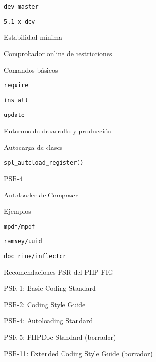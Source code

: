 \begin{longenum}
\begin{longenum}
\begin{longenum}
\begin{longenum}
                \begin{longenum}
                    \item \texttt{dev-master}
                    \item \texttt{5.1.x-dev}
                \end{longenum}
                \item Estabilidad mínima
                \item Comprobador online de restricciones
            \end{longenum}
            \item Comandos básicos
            \begin{longenum}
                \item \texttt{require}
                \item \texttt{install}
                \item \texttt{update}
            \end{longenum}
            \item Entornos de desarrollo y producción
        \end{longenum}
        \item Autocarga de clases
        \begin{longenum}
            \item \texttt{spl\_autoload\_register()}
            \item PSR-4
            \item Autoloader de Composer
        \end{longenum}
        \item Ejemplos
        \begin{longenum}
            \item \texttt{mpdf/mpdf}
            \item \texttt{ramsey/uuid}
            \item \texttt{doctrine/inflector}
        \end{longenum}
        \item Recomendaciones PSR del PHP-FIG
        \begin{longenum}
            \item PSR-1: Basic Coding Standard
            \item PSR-2: Coding Style Guide
            \item PSR-4: Autoloading Standard
            \item PSR-5: PHPDoc Standard (borrador)
            \item PSR-11: Extended Coding Style Guide (borrador)

\end{longenum}
\end{longenum}
\end{longenum}
